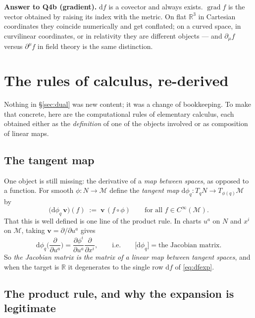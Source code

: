 \documentclass[10pt,a4paper]{article}
\newcommand{\dd}{\mathrm{d}}
\newcommand{\R}{\mathbb{R}}
\newcommand{\M}{\mathcal{M}}
\newcommand{\pd}[2]{\frac{\partial #1}{\partial #2}}
\newcommand{\pdi}[1]{\frac{\partial}{\partial #1}}
\newcommand{\vv}{\mathbf{v}}
\DeclareMathOperator{\grad}{grad}
\theoremstyle{plain}
\theoremstyle{definition}
\numberwithin{equation}{section}
\begin{document}
\begin{keybox}
\textbf{Answer to Q4b (gradient).} $\dd f$ is a covector and always exists. $\grad f$ is the
vector obtained by raising its index with the metric. On flat $\R^3$ in Cartesian coordinates
they coincide numerically and get conflated; on a curved space, in curvilinear coordinates, or
in relativity they are different objects --- and $\partial_\mu f$ versus $\partial^\mu f$ in
field theory is the same distinction.
\end{keybox}


\section{The rules of calculus, re-derived}
\label{sec:rules}

Nothing in \S\ref{sec:dual} was new content; it was a change of bookkeeping. To make that
concrete, here are the computational rules of elementary calculus, each obtained either as the
\emph{definition} of one of the objects involved or as composition of linear maps.

\subsection{The tangent map}
\label{sec:tangentmap}

One object is still missing: the derivative of a \emph{map between spaces}, as opposed to a
function. For smooth $\phi:N\to\M$ define the \emph{tangent map}
$\dd\phi_q:T_qN\to T_{\phi(q)}\M$ by
\begin{equation}
\big(\dd\phi_q\,\vv\big)(f)\;:=\;\vv\,(f\circ\phi)\qquad\text{for all }f\in C^\infty(\M).
\label{eq:pushforward}
\end{equation}
That this is well defined is one line of the product rule. In charts $u^a$ on $N$ and $x^i$ on
$\M$, taking $\vv=\partial/\partial u^a$ gives
\begin{equation}
\dd\phi_q\Big(\pdi{u^a}\Big)=\pd{\phi^i}{u^a}\pdi{x^i},
\qquad\text{i.e.}\qquad \big[\dd\phi_q\big]=\text{the Jacobian matrix.}
\label{eq:jacobianmatrix}
\end{equation}
So \emph{the Jacobian matrix is the matrix of a linear map between tangent spaces}, and when the
target is $\R$ it degenerates to the single row $\dd f$ of \eqref{eq:dfexp}.

\subsection{The product rule, and why the expansion is legitimate}
\label{sec:productrule}
\end{document}
